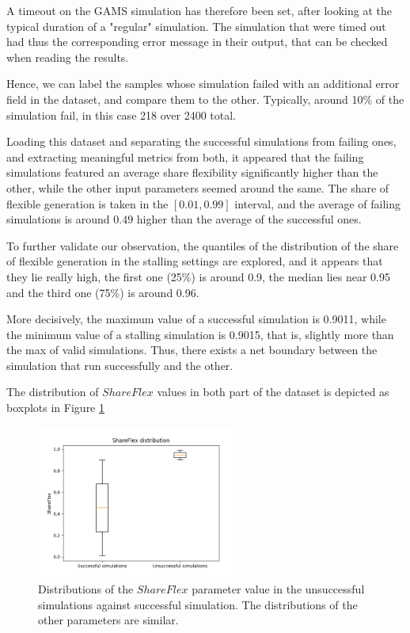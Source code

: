 A timeout on the GAMS simulation has therefore been set, after looking at the typical duration of a "regular" simulation. The simulation that were timed out had thus the corresponding error message in their output, that can be checked when reading the results.

Hence, we can label the samples whose simulation failed with an additional error field in the dataset, and compare them to the other. Typically, around 10\% of the simulation fail, in this case 218 over 2400 total.

Loading this dataset and separating the successful simulations from failing ones, and extracting meaningful metrics from both, it appeared that the failing simulations featured an average share flexibility significantly higher than the other, while the other input parameters seemed around the same. The share of flexible generation is taken in the $[0.01, 0.99]$ interval, and the average of failing simulations is around $0.49$ higher than the average of the successful ones.

To further validate our observation, the quantiles of the distribution of the share of flexible generation in the stalling settings are explored, and it appears that they lie really high, the first one (25\%) is around 0.9, the median lies near 0.95 and the third one (75\%) is around 0.96. 

More decisively, the maximum value of a successful simulation is 0.9011, while the minimum value of a stalling simulation is 0.9015, that is, slightly more than the max of valid simulations. Thus, there exists a net boundary between the simulation that run successfully and the other. 

The distribution of $ShareFlex$ values in both part of the dataset is depicted as boxplots in Figure \ref{fig:stalling-simulations}

\begin{figure}[h]
    \centering
    \includegraphics[width=0.6\textwidth]{resources/images/share-flex-boxplots.png}
    \caption{Distributions of the $ShareFlex$ parameter value in the unsuccessful simulations against successful simulation. The distributions of the other parameters are similar.}
    \label{fig:stalling-simulations}
\end{figure}

